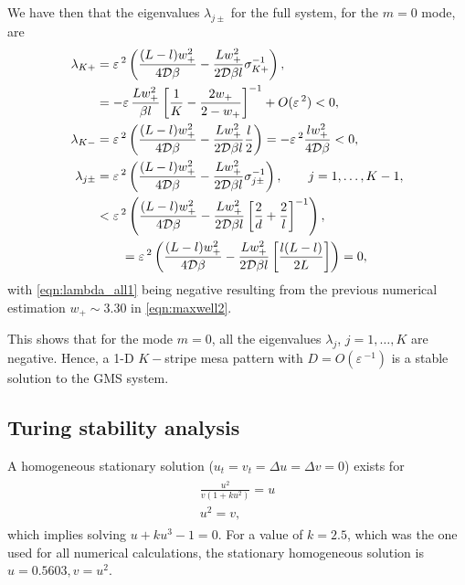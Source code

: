 \documentclass[a4paper,10pt]{article}
\newcommand{\De}{\ensuremath{\Delta}}
\newcommand{\lA}{\ensuremath{\lambda}}
\newcommand{\Ep}{\ensuremath{\varepsilon\,}}
\newcommand{\DD}{\ensuremath{\mathcal{D}}}
\begin{document}
We have then that the eigenvalues $\lA_{j\pm}$ for the full system, for the $m=0$ mode, are
%
\begin{subequations}
\label{eqn:lambda_all}
\begin{align}
\label{eqn:lambda_all1}
  \lA_{K+} &= \Ep^2\left(\frac{(L-l)w_+^2}{4\DD\beta}-\frac{Lw_+^2}{2\DD\beta l}\sigma_{K+}^{-1} \right),\\
		  &= - \Ep\frac{Lw_+^2}{\beta l}\left[\frac{1}{K}-\frac{2w_+}{2-w_+}\right]^{-1} +O(\Ep^2)<0,\notag\\
\label{eqn:lambda_all2}
  \lA_{K-} &= \Ep^2\left(\frac{(L-l)w_+^2}{4\DD\beta}-\frac{Lw_+^2}{2\DD\beta l}\frac{l}{2}\right) = -\Ep^2\frac{lw_+^2}{4\DD\beta}<0,\\
\label{eqn:lambda_all3}
  \lA_{j\pm} &= \Ep^2\left(\frac{(L-l)w_+^2}{4\DD\beta}-\frac{Lw_+^2}{2\DD\beta l}\sigma_{j\pm}^{-1} \right),\qquad j=1,\hdots,K-1,\\
		  &<\Ep^2\left(\frac{(L-l)w_+^2}{4\DD\beta}-\frac{Lw_+^2}{2\DD\beta l}\left[\frac{2}{d}+\frac{2}{l}\right]^{-1} \right),\notag\\
		  &\qquad = \Ep^2\left(\frac{(L-l)w_+^2}{4\DD\beta}-\frac{Lw_+^2}{2\DD\beta l}\left[\frac{l(L-l)}{2L}\right] \right) = 0,\notag
\end{align}
\end{subequations}
% 
with \eqref{eqn:lambda_all1} being negative resulting from the previous numerical estimation $w_+\sim3.30$ in \eqref{eqn:maxwell2}.

This shows that for the mode $m=0$, all the eigenvalues $\lA_j$, $j=1,\hdots,K$ are negative. Hence, a 1-D $K-$stripe mesa pattern with $D=O(\Ep^{-1})$ is a stable solution to the GMS system.

\subsection{Turing stability analysis}

A homogeneous stationary solution ($u_t = v_t = \De u = \De v = 0$) exists for
% 
\begin{equation}
\label{eqn:homog_soln}
\begin{split}
\begin{aligned}
	\frac{u^2}{v(1+ku^2)} = u \\
    u^2 = v,
\end{aligned}
\end{split}
\end{equation}
% 
which implies solving $u+ku^3-1 = 0$. For a value of $k = 2.5$, which was the one used for all numerical calculations, the stationary homogeneous solution is $u=0.5603,v=u^2$.
\end{document}
